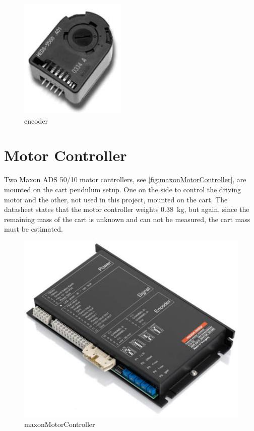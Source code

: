 
\begin{figure}[H]
  \includegraphics[width=.16\textwidth]{figures/infineonEncoderHEDS5540-A14}
  \caption{encoder}
  \label{fig:encoder}
\end{figure}

\section{Motor Controller}
Two Maxon ADS 50/10 motor controllers, see \autoref{fig:maxonMotorController}, are mounted on the cart pendulum setup. One on the side to control the driving motor and the other, not used in this project, mounted on the cart. The datasheet states that the motor controller weights \SI{0.38}{kg}, but again, since the remaining mass of the cart is unknown and can not be measured, the cart mass must be estimated.


\begin{figure}[H]
  \includegraphics[width=.26\textwidth]{figures/maxonMotorController}
  \caption{maxonMotorController}
  \label{fig:maxonMotorController}
\end{figure}

